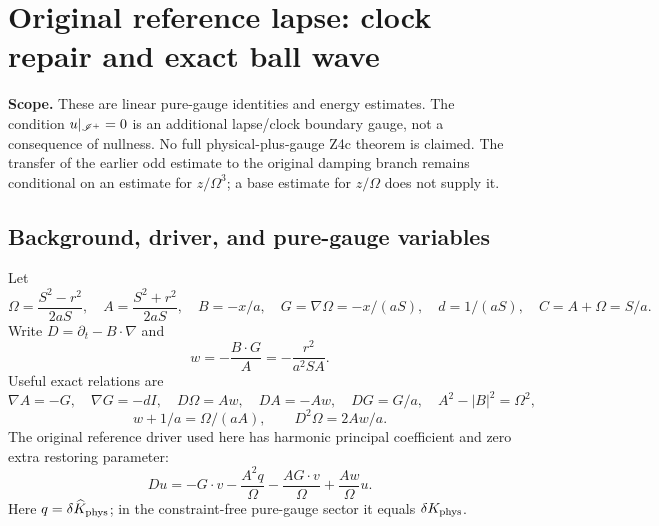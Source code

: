 \section{Original reference lapse: clock repair and exact ball wave}
\noindent\textbf{Scope.} These are linear pure-gauge identities and energy estimates. The condition $u|_{\mathscr I^+}=0$ is an additional lapse/clock boundary gauge, not a consequence of nullness. No full physical-plus-gauge Z4c theorem is claimed. The transfer of the earlier odd estimate to the original damping branch remains conditional on an estimate for $z/\Omega^3$; a base estimate for $z/\Omega$ does not supply it.

\subsection{Background, driver, and pure-gauge variables}
Let
\[
 \Omega=\frac{S^2-r^2}{2aS},\quad A=\frac{S^2+r^2}{2aS},\quad
 B=-x/a,\quad G=\nabla\Omega=-x/(aS),\quad d=1/(aS),\quad C=A+\Omega=S/a.
\]
Write $D=\partial_t-B\cdot\nabla$ and
\[
 w=-\frac{B\cdot G}{A}=-\frac{r^2}{a^2SA}.
\]
Useful exact relations are
\[
 \nabla A=-G,\quad \nabla G=-dI,\quad D\Omega=Aw,\quad DA=-Aw,
 \quad DG=G/a,\quad A^2-|B|^2=\Omega^2,
\]
\[
 w+1/a=\Omega/(aA),\qquad D^2\Omega=2Aw/a.
\]
The original reference driver used here has harmonic principal coefficient and zero extra restoring parameter:
\begin{equation}
 Du=-G\cdot v-\frac{A^2q}{\Omega}-\frac{AG\cdot v}{\Omega}
       +\frac{Aw}{\Omega}u.\label{driver}
\end{equation}
Here $q=\delta\widehat K_{\rm phys}$; in the constraint-free pure-gauge sector it equals $\delta K_{\rm phys}$.

